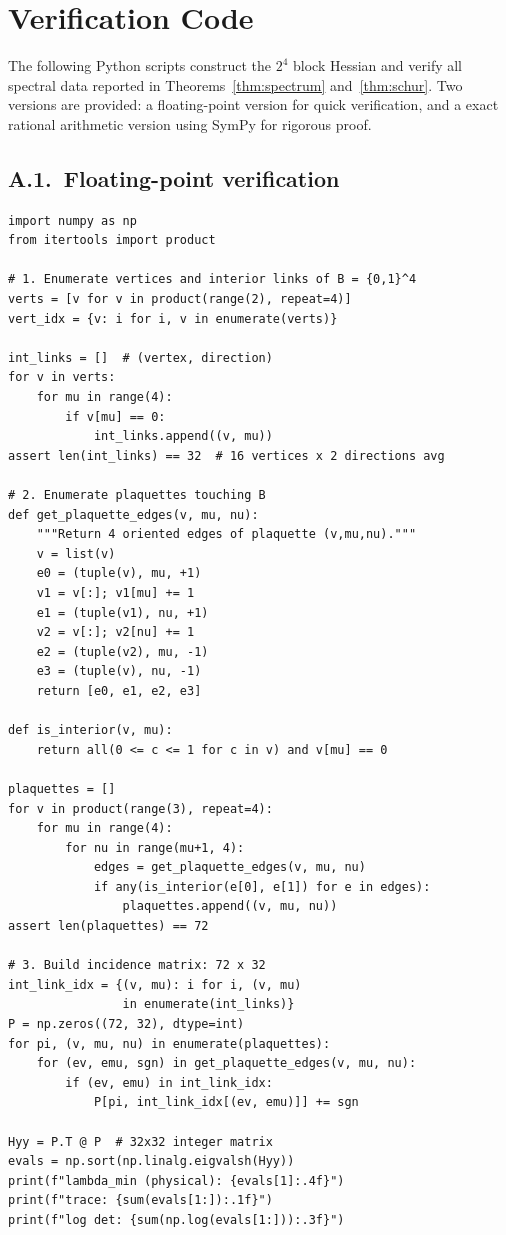 \documentclass[11pt]{article}
\theoremstyle{definition}
\begin{document}
\section{Verification Code}\label{app:code}

The following Python scripts construct the $2^4$ block Hessian and
verify all spectral data reported in Theorems~\ref{thm:spectrum}
and~\ref{thm:schur}.  Two versions are provided: a floating-point
version for quick verification, and a exact rational arithmetic
version using SymPy for rigorous proof.

\subsection*{A.1.~Floating-point verification}

\begin{verbatim}
import numpy as np
from itertools import product

# 1. Enumerate vertices and interior links of B = {0,1}^4
verts = [v for v in product(range(2), repeat=4)]
vert_idx = {v: i for i, v in enumerate(verts)}

int_links = []  # (vertex, direction)
for v in verts:
    for mu in range(4):
        if v[mu] == 0:
            int_links.append((v, mu))
assert len(int_links) == 32  # 16 vertices x 2 directions avg

# 2. Enumerate plaquettes touching B
def get_plaquette_edges(v, mu, nu):
    """Return 4 oriented edges of plaquette (v,mu,nu)."""
    v = list(v)
    e0 = (tuple(v), mu, +1)
    v1 = v[:]; v1[mu] += 1
    e1 = (tuple(v1), nu, +1)
    v2 = v[:]; v2[nu] += 1
    e2 = (tuple(v2), mu, -1)
    e3 = (tuple(v), nu, -1)
    return [e0, e1, e2, e3]

def is_interior(v, mu):
    return all(0 <= c <= 1 for c in v) and v[mu] == 0

plaquettes = []
for v in product(range(3), repeat=4):
    for mu in range(4):
        for nu in range(mu+1, 4):
            edges = get_plaquette_edges(v, mu, nu)
            if any(is_interior(e[0], e[1]) for e in edges):
                plaquettes.append((v, mu, nu))
assert len(plaquettes) == 72

# 3. Build incidence matrix: 72 x 32
int_link_idx = {(v, mu): i for i, (v, mu)
                in enumerate(int_links)}
P = np.zeros((72, 32), dtype=int)
for pi, (v, mu, nu) in enumerate(plaquettes):
    for (ev, emu, sgn) in get_plaquette_edges(v, mu, nu):
        if (ev, emu) in int_link_idx:
            P[pi, int_link_idx[(ev, emu)]] += sgn

Hyy = P.T @ P  # 32x32 integer matrix
evals = np.sort(np.linalg.eigvalsh(Hyy))
print(f"lambda_min (physical): {evals[1]:.4f}")
print(f"trace: {sum(evals[1:]):.1f}")
print(f"log det: {sum(np.log(evals[1:])):.3f}")
\end{verbatim}
\end{document}
